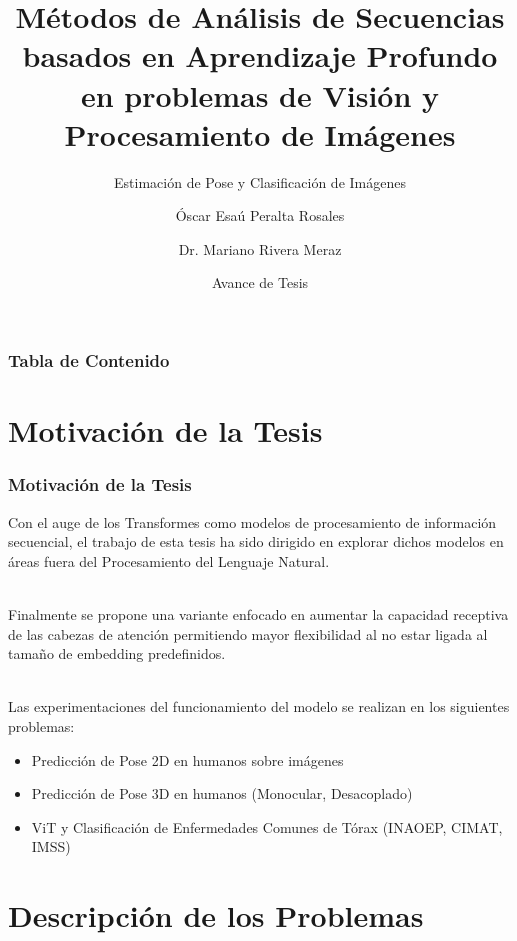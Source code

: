 \documentclass{beamer}
\title[Avance de Tesis] %
{Métodos de Análisis de Secuencias basados en Aprendizaje Profundo en problemas de Visión y Procesamiento de Imágenes}
\subtitle{Estimación de Pose y Clasificación de Imágenes}
\author[Esaú Peralta] %
{Óscar Esaú Peralta Rosales\inst{1} \and Dr. Mariano Rivera Meraz\inst{1}}
\institute[CIMAT] %
{
  \inst{1}%
  Centro de Investigación en Matemáticas A.C.
}
\date[Julio 2021] %
{Avance de Tesis}
\begin{document}
\frame{\titlepage}


\begin{frame}
\frametitle{Tabla de Contenido}
\tableofcontents
\end{frame}


\section{Motivación de la Tesis}


\begin{frame}
\frametitle{Motivación de la Tesis}
Con el auge de los Transformes como modelos de procesamiento de información secuencial, el trabajo
de esta tesis ha sido dirigido en explorar dichos modelos en áreas fuera del Procesamiento del
Lenguaje Natural.\\~\

Finalmente se propone una variante enfocado en aumentar la capacidad receptiva de las cabezas de
atención permitiendo mayor flexibilidad al no estar ligada al tamaño de embedding predefinidos.\\~\

Las experimentaciones del funcionamiento del modelo se realizan en los siguientes problemas:
\begin{itemize}
    \item Predicción de Pose 2D en humanos sobre imágenes
    \item Predicción de Pose 3D en humanos (Monocular, Desacoplado)
    \item ViT y Clasificación de Enfermedades Comunes de Tórax (INAOEP, CIMAT, IMSS)
\end{itemize}
\end{frame}


\section{Descripción de los Problemas}
\end{document}
